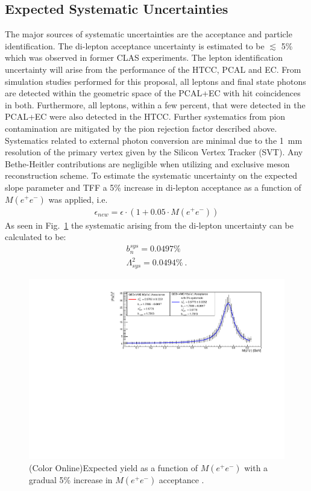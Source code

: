 \documentclass[11pt,a4paper,twocolumn]{article}
\newlength{\figwidth}
\newlength{\qfigheight}
\def\epem{e^+e^-}
\begin{document}
\subsection{Expected Systematic Uncertainties}
The major sources of systematic uncertainties are the acceptance and particle identification. The di-lepton acceptance uncertainty is estimated to be $\lesssim$ 5\% which was observed in former CLAS experiments. The lepton identification uncertainty will arise from the performance of the HTCC, PCAL and EC. From simulation studies performed for this proposal, all leptons and final state photons are detected within the geometric space of the PCAL+EC with hit coincidences in both. Furthermore, all leptons, within a few percent, that were detected in the PCAL+EC were also detected in the HTCC. Further systematics from pion contamination are mitigated by the pion rejection factor described above. Systematics related to external photon conversion are minimal due to the  1~mm resolution of the primary vertex given by the Silicon Vertex Tracker (SVT). Any Bethe-Heitler contributions are negligible when utilizing and exclusive meson reconstruction scheme. To estimate the systematic uncertainty on the expected slope parameter and TFF a 5\% increase in di-lepton acceptance as a function of $M(\epem)$ was applied, i.e.
\begin{align}
\epsilon_{new} = \epsilon \cdot (1+0.05 \cdot M(\epem)) \label{eq:sys} 
\end{align}
As seen in Fig.~\ref{fig:EPEMsys} the systematic arising from the di-lepton uncertainty can be calculated to be:
\begin{align}
	b_{n}^{sys} =0.0497 \% \\
\Lambda^{2}_{sys} = 0.0494 \%\ .
\end{align}
\begin{figure}[h!]\begin{center}
\includegraphics[width=\figwidth,height=1.3\qfigheight]{figures/sys.pdf}
\caption[Acceptance as a function of $M(\epem)$]{\label{fig:EPEMsys}{(Color Online)Expected yield as a function of $M(\epem)$ with a gradual 5\% increase in $M(\epem)$ acceptance .}}
	\end{center}\end{figure}
\FloatBarrier
\end{document}
